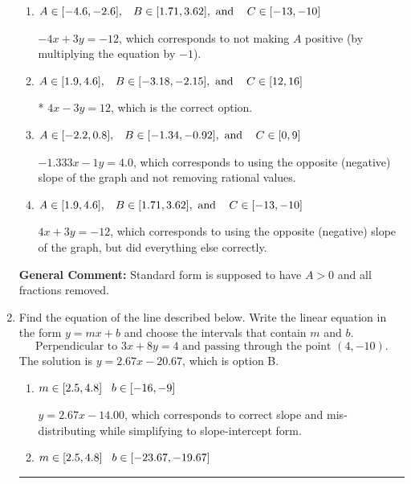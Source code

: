 \documentclass{extbook}[14pt]
\newcommand{\litem}[1]{\item #1

\rule{\textwidth}{0.4pt}}
\begin{document}
\begin{enumerate}
{\begin{enumerate}[label=\Alph*.]
 $-1.333x + 1y = -4.0$, which corresponds to not removing rational values for Standard Form.
\item \( A \in [-4.6, -2.6], \hspace{3mm} B \in [1.71, 3.62], \text{ and } \hspace{3mm} C \in [-13, -10] \)

 $-4x + 3y = -12$, which corresponds to not making $A$ positive (by multiplying the equation by $-1$).
\item \( A \in [1.9, 4.6], \hspace{3mm} B \in [-3.18, -2.15], \text{ and } \hspace{3mm} C \in [12, 16] \)

* $4x - 3y = 12$, which is the correct option.
\item \( A \in [-2.2, 0.8], \hspace{3mm} B \in [-1.34, -0.92], \text{ and } \hspace{3mm} C \in [0, 9] \)

 $-1.333x - 1y = 4.0$, which corresponds to using the opposite (negative) slope of the graph and not removing rational values.
\item \( A \in [1.9, 4.6], \hspace{3mm} B \in [1.71, 3.62], \text{ and } \hspace{3mm} C \in [-13, -10] \)

 $4x + 3y = -12$, which corresponds to using the opposite (negative) slope of the graph, but did everything else correctly.
\end{enumerate}

\textbf{General Comment:} Standard form is supposed to have $A > 0$ and all fractions removed.
}
\litem{
Find the equation of the line described below. Write the linear equation in the form $ y=mx+b $ and choose the intervals that contain $m$ and $b$.
\[ \text{Perpendicular to } 3 x + 8 y = 4 \text{ and passing through the point } (4, -10). \]The solution is \( y = 2.67x - 20.67 \), which is option B.\begin{enumerate}[label=\Alph*.]
\item \( m \in [2.5, 4.8] \hspace*{3mm} b \in [-16, -9] \)

 $y = 2.67x - 14.00$, which corresponds to correct slope and mis-distributing while simplifying to slope-intercept form.
\item \( m \in [2.5, 4.8] \hspace*{3mm} b \in [-23.67, -19.67] \)


\end{enumerate}}
\end{enumerate}
\end{document}
